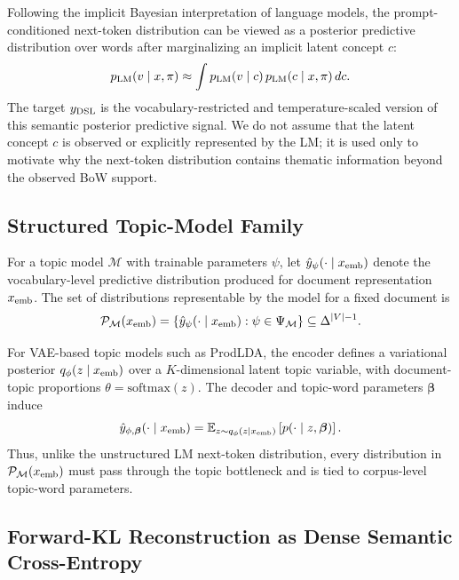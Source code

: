 \documentclass{article}
\theoremstyle{plain}
\theoremstyle{definition}
\theoremstyle{remark}
\begin{document}
Following the implicit Bayesian interpretation of language models, the prompt-conditioned next-token distribution can be viewed as a posterior predictive distribution over words after marginalizing an implicit latent concept $c$:
\begin{equation}
p_{\rm LM}(v\mid x,\pi)
\approx
\int p_{\rm LM}(v\mid c)\,p_{\rm LM}(c\mid x,\pi)\,dc.
\label{eq:app-implicit-posterior}
\end{equation}
The target $y_{\rm DSL}$ is the vocabulary-restricted and temperature-scaled version of this semantic posterior predictive signal. We do not assume that the latent concept $c$ is observed or explicitly represented by the LM; it is used only to motivate why the next-token distribution contains thematic information beyond the observed BoW support.

\subsection{Structured Topic-Model Family}

For a topic model $\mathcal{M}$ with trainable parameters $\psi$, let $\hat{y}_{\psi}(\cdot\mid x_{\rm emb})$ denote the vocabulary-level predictive distribution produced for document representation $x_{\rm emb}$. The set of distributions representable by the model for a fixed document is
\begin{equation}
\mathcal{P}_{\mathcal{M}}(x_{\rm emb})
=
\left\{
\hat{y}_{\psi}(\cdot\mid x_{\rm emb}) : \psi\in\Psi_{\mathcal{M}}
\right\}
\subseteq \Delta^{|V|-1}.
\label{eq:app-model-family}
\end{equation}

For VAE-based topic models such as ProdLDA, the encoder defines a variational posterior $q_{\phi}(z\mid x_{\rm emb})$ over a $K$-dimensional latent topic variable, with document-topic proportions $\theta=\mathrm{softmax}(z)$. The decoder and topic-word parameters $\boldsymbol{\beta}$ induce
\begin{equation}
\hat{y}_{\phi,\boldsymbol{\beta}}(\cdot\mid x_{\rm emb})
=
\mathbb{E}_{z\sim q_{\phi}(z\mid x_{\rm emb})}
\left[p(\cdot\mid z,\boldsymbol{\beta})\right].
\label{eq:app-topic-predictive}
\end{equation}
Thus, unlike the unstructured LM next-token distribution, every distribution in $\mathcal{P}_{\mathcal{M}}(x_{\rm emb})$ must pass through the topic bottleneck and is tied to corpus-level topic-word parameters.

\subsection{Forward-KL Reconstruction as Dense Semantic Cross-Entropy}
\end{document}
